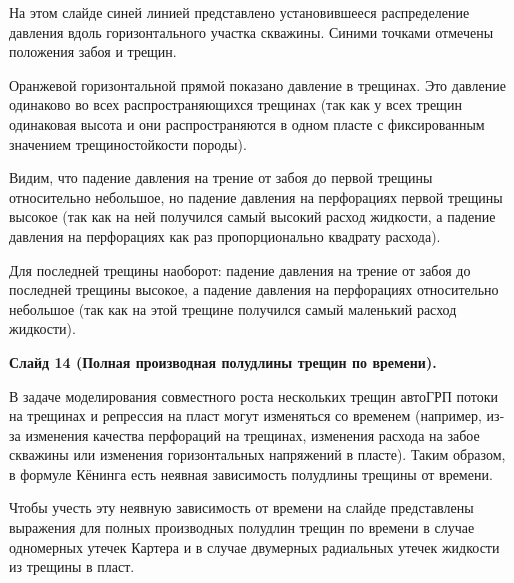 \documentclass[a4paper, 12pt]{article}
\begin{document}
На этом слайде синей линией представлено установившееся распределение давления вдоль горизонтального участка скважины.
Синими точками отмечены положения забоя и трещин.

Оранжевой горизонтальной прямой показано давление в трещинах.
Это давление одинаково во всех распространяющихся трещинах (так как у всех трещин одинаковая высота и они распространяются в одном пласте с фиксированным значением трещиностойкости породы).

Видим, что падение давления на трение от забоя до первой трещины относительно небольшое, но падение давления на перфорациях первой трещины высокое (так как на ней получился самый высокий расход жидкости, а падение давления на перфорациях как раз пропорционально квадрату расхода).

Для последней трещины наоборот: падение давления на трение от забоя до последней трещины высокое, а падение давления на перфорациях относительно небольшое (так как на этой трещине получился самый маленький расход жидкости).
\\

\begin{comment}
\textbf{Слайд 13 (Формулы Кёнинга).}

В работе Кёнинга получены формулы зависимости полудлины трещины гидроразрыва от расхода жидкости, фильтрационно-ёмкостных свойств пласта, репрессии на пласт и времени при условии доминирования утечек жидкости из трещины в пласт.

Представлено две формулы: первая -- для случая одномерных утечек, перпендикулярных трещине; вторая -- для случая двумерных радиальных утечек жидкости из трещины в пласт.

В этих формулах явная зависимость полудлины трещины от времени корневая.
\\
\end{comment}

\textbf{Слайд 14 (Полная производная полудлины трещин по времени).}

В задаче моделирования совместного роста нескольких трещин автоГРП потоки на трещинах и репрессия на пласт могут изменяться со временем (например, из-за изменения качества перфораций на трещинах, изменения расхода на забое скважины или изменения горизонтальных напряжений в пласте).
Таким образом, в формуле Кёнинга есть неявная зависимость полудлины трещины от времени.

Чтобы учесть эту неявную зависимость от времени на слайде представлены выражения для полных производных полудлин трещин по времени в случае одномерных утечек Картера и в случае двумерных радиальных утечек жидкости из трещины в пласт.
\\
\end{document}
